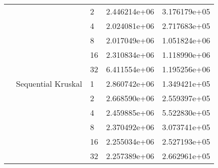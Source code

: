\begin{tabular}{lllrr}
                       &                    & 2  &  2.446214e+06 &  3.176179e+05 \\
                       &                    & 4  &  2.024081e+06 &  2.717683e+05 \\
                       &                    & 8  &  2.017049e+06 &  1.051824e+06 \\
                       &                    & 16 &  2.310834e+06 &  1.118990e+06 \\
                       &                    & 32 &  6.411554e+06 &  1.195256e+06 \\
                       & Sequential Kruskal & 1  &  2.860742e+06 &  1.349421e+05 \\
                       &                    & 2  &  2.668590e+06 &  2.559397e+05 \\
                       &                    & 4  &  2.459885e+06 &  5.522830e+05 \\
                       &                    & 8  &  2.370492e+06 &  3.073741e+05 \\
                       &                    & 16 &  2.255034e+06 &  2.527193e+05 \\
                       &                    & 32 &  2.257389e+06 &  2.662961e+05 \\
\bottomrule
\end{tabular}
